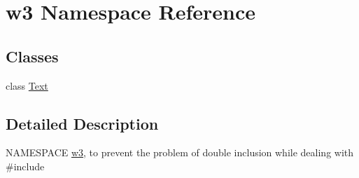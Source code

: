 \hypertarget{namespacew3}{}\section{w3 Namespace Reference}
\label{namespacew3}
\subsection*{Classes}
\begin{DoxyCompactItemize}
\item 
class \mbox{\hyperlink{classw3_1_1Text}{Text}}
\end{DoxyCompactItemize}


\subsection{Detailed Description}
N\+A\+M\+E\+S\+P\+A\+CE \mbox{\hyperlink{namespacew3}{w3}}, to prevent the problem of double inclusion while dealing with \#include 